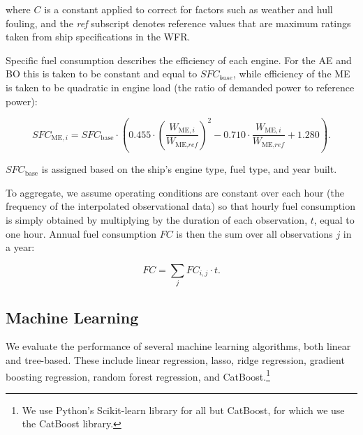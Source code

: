 where $C$ is a constant applied to correct for factors such as weather and hull fouling, and the \textit{ref} subscript denotes reference values that are maximum ratings taken from ship specifications in the \ac{WFR}.

Specific fuel consumption describes the efficiency of each engine. For the \acl{AE} and \acl{BO} this is taken to be constant and equal to $SFC_{base}$, while efficiency of the \acl{ME} is taken to be quadratic in engine load (the ratio of demanded power to reference power):

\begin{equation*}
SFC_{\text{ME},i} = SFC_{\text{base}} \cdot \left(0.455 \cdot \left(\frac{W_{\text{ME},i}}{W_{\text{ME},\textit{ref}}}\right)^2 - 0.710 \cdot \frac{W_{\text{ME},i}}{W_{\text{ME},\textit{ref}}} + 1.280\right).
\end{equation*}

$SFC_{\text{base}}$ is assigned based on the ship's engine type, fuel type, and year built.


To aggregate, we assume operating conditions are constant over each hour (the frequency of the interpolated observational data) so that hourly fuel consumption is simply obtained by multiplying by the duration of each observation, $t$, equal to one hour. Annual fuel consumption $FC$ is then the sum over all observations $j$ in a year:

\begin{equation}\label{eqn:annual_fc}
    FC = \sum_j FC_{i,j} \cdot t.
\end{equation}


\subsection{Machine Learning}\label{subsec:machinelearning}
We evaluate the performance of several machine learning algorithms, both linear and tree-based. These include linear regression, lasso, ridge regression, gradient boosting regression, random forest regression, and CatBoost.\footnote{We use Python's Scikit-learn library for all but CatBoost, for which we use the CatBoost library.}

